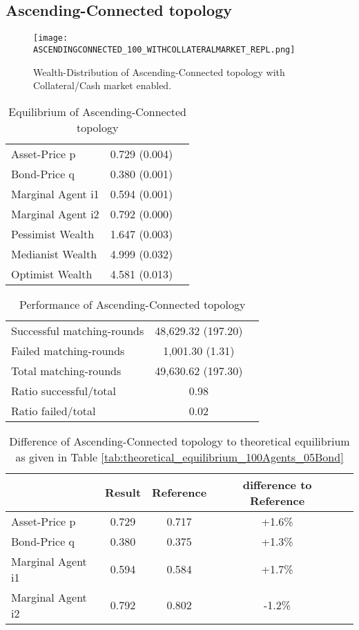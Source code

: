 \documentclass[Bachelorarbeit.tex]{subfiles}
\begin{document}
\subsection{Ascending-Connected topology}
\begin{figure}[H]
	\centering
  \texttt{[image: ASCENDINGCONNECTED\_100\_WITHCOLLATERALMARKET\_REPL.png]}
	\caption{Wealth-Distribution of Ascending-Connected topology with Collateral/Cash market enabled.}
	\label{fig:wealth_ASCENDINGCONNECTED_100_WITHCOLLATERALMARKET_REPL}
\end{figure}

\begin{table}[H]
	\caption{Equilibrium of Ascending-Connected topology}
	\centering
	\begin{tabular} { l c r }
		\hline
		Asset-Price p & 0.729 (0.004) \\
		Bond-Price q & 0.380 (0.001) \\
		Marginal Agent i1 & 0.594 (0.001) \\
		Marginal Agent i2 & 0.792 (0.000) \\
		\hline
		Pessimist Wealth & 1.647 (0.003) \\
		Medianist Wealth & 4.999 (0.032) \\
		Optimist Wealth & 4.581 (0.013) \\
		\hline
	\end{tabular}
\end{table} 

\begin{table}[H]
	\caption{Performance of Ascending-Connected topology}
	\centering
	\begin{tabular} { l c r }
		\hline
		Successful matching-rounds & 48,629.32 (197.20) \\
		Failed matching-rounds & 1,001.30 (1.31) \\
		Total matching-rounds & 49,630.62 (197.30) \\
		\hline
		Ratio successful/total & 0.98 \\
		Ratio failed/total & 0.02 \\
		\hline
	\end{tabular}
\end{table}

\begin{table}[H]
	\caption{Difference of Ascending-Connected topology to theoretical equilibrium as given in Table \ref{tab:theoretical_equilibrium_100Agents_05Bond}}
	\centering
	\begin{tabular} { l c c c r }
		& Result & Reference & difference to Reference \\
		\hline
		Asset-Price p & 0.729 & 0.717 & +1.6\% \\
		Bond-Price q & 0.380 & 0.375 & +1.3\% \\
		Marginal Agent i1 & 0.594 & 0.584 & +1.7\% \\
		Marginal Agent i2 & 0.792 & 0.802 & -1.2\% \\
		\hline
	\end{tabular}
\end{table} 
\end{document}
